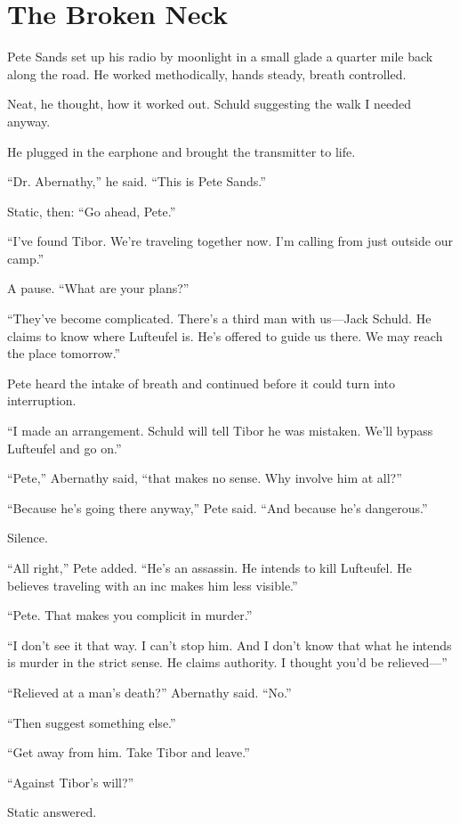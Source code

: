 \chapter{The Broken Neck}

Pete Sands set up his radio by moonlight in a small glade a quarter mile back along the road. He worked methodically, hands steady, breath controlled.

Neat, he thought, how it worked out. Schuld suggesting the walk I needed anyway.

He plugged in the earphone and brought the transmitter to life.

“Dr. Abernathy,” he said. “This is Pete Sands.”

Static, then: “Go ahead, Pete.”

“I’ve found Tibor. We’re traveling together now. I’m calling from just outside our camp.”

A pause. “What are your plans?”

“They’ve become complicated. There’s a third man with us—Jack Schuld. He claims to know where Lufteufel is. He’s offered to guide us there. We may reach the place tomorrow.”

Pete heard the intake of breath and continued before it could turn into interruption.

“I made an arrangement. Schuld will tell Tibor he was mistaken. We’ll bypass Lufteufel and go on.”

“Pete,” Abernathy said, “that makes no sense. Why involve him at all?”

“Because he’s going there anyway,” Pete said. “And because he’s dangerous.”

Silence.

“All right,” Pete added. “He’s an assassin. He intends to kill Lufteufel. He believes traveling with an inc makes him less visible.”

“Pete. That makes you complicit in murder.”

“I don’t see it that way. I can’t stop him. And I don’t know that what he intends is murder in the strict sense. He claims authority. I thought you’d be relieved—”

“Relieved at a man’s death?” Abernathy said. “No.”

“Then suggest something else.”

“Get away from him. Take Tibor and leave.”

“Against Tibor’s will?”

Static answered.

